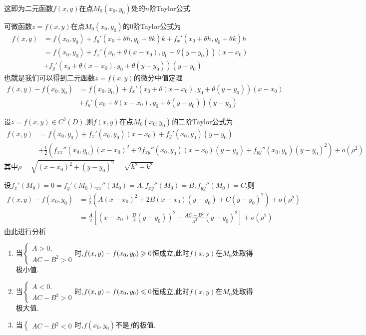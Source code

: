 这即为二元函数$f(x,y)$在点$M_0(x_0,y_0)$处的$n$阶Taylor公式.

\begin{example}
    可微函数$z = f(x,y)$在点$M_0(x_0,y_0)$的0阶Taylor公式为
    \begin{align*}
        f(x,y) &= f(x_0,y_0) + f_y'(x_0 + \theta h,y_0 + \theta k) k + f_x'(x_0 + \theta h,y_0 + \theta k)h\\
        &= f(x_0,y_0) + f_x'\left(x_0 + \theta(x-x_0),y_0 + \theta(y-y_0)\right)(x-x_0) \\
        &+ f_y'\left(x_0 + \theta(x-x_0),y_0 + \theta(y-y_0)\right)(y-y_0)
    \end{align*}
    也就是我们可以得到二元函数$z =f(x,y) $的微分中值定理
    \begin{align*}
        f(x,y)-f(x_0,y_0) &= f(x_0,y_0) + f_x'\left(x_0 + \theta(x-x_0),y_0 + \theta(y-y_0)\right)(x-x_0)\\&+ f_y'\left(x_0 + \theta(x-x_0),y_0 + \theta(y-y_0)\right)(y-y_0)
    \end{align*}

\end{example}

\begin{example}
设$z =f(x,y) \in C^3(D)$,则$f(x,y)$在点$M_0(x_0,y_0)$的二阶Taylor公式为
\begin{align*}
    f(x,y) &= f(x_0,y_0) + f_x'(x_0,y_0)(x-x_0) + f_y'(x_0,y_0)(y-y_0)\\
    &+ \frac{1}{2} \left( f_{xx}''(x_0,y_0)(x-x_0)^2 + 2f_{xy}''(x_0,y_0)(x-x_0)(y-y_0) + f_{yy}''(x_0,y_0)(y-y_0)^2 \right) + o(\rho^2)    
\end{align*}
其中$\rho = \sqrt{(x-x_0)^2 + (y-y_0)^2} = \sqrt{h^2 + k^2}$.

设$f_x'(M_0) = 0 = f_y'(M_0)$,$_{xx}''(M_0) = A, f_{xy}''(M_0) = B, f_{yy}''(M_0) = C$,则
\begin{align*}
    f(x,y) - f(x_0,y_0) &= \frac12 \left( A(x-x_0)^2 + 2B(x-x_0)(y-y_0) + C(y-y_0)^2 \right) + o(\rho^2)\\
    &= \frac{A}{2} \left[ \left(x-x_0 + \frac{B}{A}(y-y_0) \right)^2 + \frac{AC-B^2}{A^2}(y-y_0)^2 \right] + o(\rho^2)
\end{align*}
由此进行分析
\begin{enumerate}
    \item 当$\begin{cases}
        A > 0,\\
        AC - B^2 > 0
    \end{cases}$时,$f(x,y) - f(x_0,y_0) \geqslant 0$恒成立,此时$f(x,y)$在$M_0$处取得极小值.
    \item 当$\begin{cases}
        A < 0,\\
        AC - B^2 > 0
    \end{cases}$时,$f(x,y) - f(x_0,y_0) \leqslant 0$恒成立,此时$f(x,y)$在$M_0$处取得极大值.
    \item 当$\begin{cases}
        AC - B^2 < 0
    \end{cases}$时,$f(x_0,y_0)$不是$f$的极值.
\end{enumerate}
\end{example}


